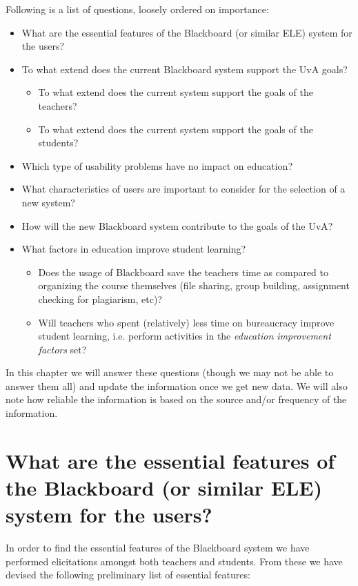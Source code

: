 Following is a list of questions, loosely ordered on importance:
\begin{itemize}
	\item What are the essential features of the Blackboard (or similar ELE) system for the users?

	\item To what extend does the current Blackboard system support the UvA goals?
	\begin{itemize}
		\item To what extend does the current system support the goals of the teachers?
		\item To what extend does the current system support the goals of the students?
	\end{itemize}
	
	\item Which type of usability problems have no impact on education?
	\item What characteristics of users are important to consider for the selection of a new system?
	\item How will the new Blackboard system contribute to the goals of the UvA?
	\item What factors in education improve student learning?
		\begin{itemize}
			\item Does the usage of Blackboard save the teachers time as compared to organizing the course themselves (file sharing, group building, assignment checking for plagiarism, etc)?
			\item Will teachers who spent (relatively) less time on bureaucracy improve student learning, i.e. perform activities in the \textit{education improvement factors} set?
		\end{itemize}
	
\end{itemize}

In this chapter we will answer these questions (though we may not be able to answer them all) and update the information once we get new data. We will also note how reliable the information is based on the source and/or frequency of the information.


\section{What are the essential features of the Blackboard (or similar ELE) system for the users?}
In order to find the essential features of the Blackboard system we have performed elicitations amongst both teachers and students. From these we have devised the following preliminary list of essential features:

